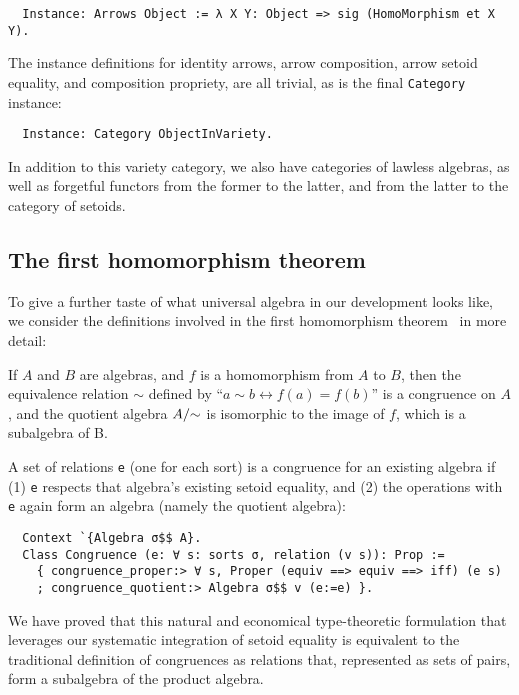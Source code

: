 \documentclass[a4paper,10pt,runningheads]{llncs}
\begin{document}
\begin{lstlisting}
  Instance: Arrows Object := λ X Y: Object => sig (HomoMorphism et X Y).
\end{lstlisting}

The instance definitions for identity arrows, arrow composition, arrow setoid equality, and composition propriety, are all trivial, as is the final \lstinline|Category| instance:
\begin{lstlisting}
  Instance: Category ObjectInVariety.
\end{lstlisting}

In addition to this variety category, we also have categories of lawless algebras, as well as forgetful functors from the former to the latter, and from the latter to the category of setoids.

\subsection{The first homomorphism theorem}
\label{homothm}

To give a further taste of what universal algebra in our development looks like, we consider the definitions involved in the first homomorphism theorem~\cite{meinke1993universal} in more detail:
\begin{theorem}
If $A$ and $B$ are algebras, and $f$ is a homomorphism from $A$ to $B$, then the equivalence relation $\sim$ defined by ``$a\sim b \leftrightarrow f(a)=f(b)$'' is a congruence on $A$, and the quotient algebra $A/\hspace{-1mm}\sim$ is isomorphic to the image of $f$, which is a subalgebra of B.
\end{theorem}

A set of relations \lstinline|e| (one for each sort) is a congruence for an existing algebra if (1) \lstinline|e| respects that algebra's existing setoid equality, and (2) the operations with \lstinline|e| again form an algebra (namely the quotient algebra):
\begin{lstlisting}
  Context `{Algebra σ$$ A}.
  Class Congruence (e: ∀ s: sorts σ, relation (v s)): Prop :=
    { congruence_proper:> ∀ s, Proper (equiv ==> equiv ==> iff) (e s)
    ; congruence_quotient:> Algebra σ$$ v (e:=e) }.
\end{lstlisting}
We have proved that this natural and economical type-theoretic formulation that leverages our systematic integration of setoid equality is equivalent to the traditional definition of congruences as relations that, represented as sets of pairs, form a subalgebra of the product algebra.
\end{document}
